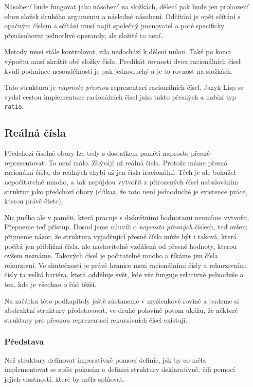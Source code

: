 Násobení bude fungovat jako násobení na složkách, dělení pak bude jen prohození obou složek druhého argumentu a následné násobení. Odčítání je opět sčítání s opačným číslem a sčítání musí najít společný jmenovatel a poté specificky přenásobovat jednotlivé operandy, ale složité to není.

Metody musí stále kontrolovat, zda nedochází k dělení nulou. Také po konci výpočtu musí zkrátit obě složky čísla. Predikát rovnosti dvou racionálních čísel kvůli podmínce nesoudělnosti je pak jednoduchý a je to rovnost na složkách.

Tato struktura je \textit{naprosto přesnou} reprezentací racionálních čísel. Jazyk Lisp se vydal cestou implementace racionálních čísel jako takto přesných a nabízí typ \texttt{ratio}.

\subsection{Reálná čísla}
Předchozí číselné obory lze tedy s dostatkem paměti naprosto přesně reprezentovat. To není málo. Zbývájí už  reálná čísla. Protože máme přesná racionální čísla, do reálných chybí už jen čísla iracionální. Těch je ale bohužel nepočitatelně mnoho, a tak nepůjdou vytvořit z přirozených čísel nabalováním struktur jako předchozí obory (důkaz, že toto není jednoduché je existence práce, kterou právě čtete).

Nic jiného ale v paměti, která pracuje s diskrétními hodnotami neumíme vytvořit. Přepneme teď přístup. Dosud jsme mluvili o \textit{naprosto přesných} číslech, teď ovšem přijmeme názor, že struktura vyjadřující přesné číslo může být i taková, která počítá jen přibližná čísla, ale nastavitelně vzdálená od přesné hodnoty, kterou ovšem neznáme. Takových čísel je počitatelně mnoho a říkáme jim čísla rekurzivní. Ve skutečnosti je právě hranice mezi racionálními čísly a rekurzivními čísly ta velká bariéra, která odděluje svět, kde vše funguje relativně jednoduše a ten, kde je všechno o řád těžší.

Na začátku této podkapitoly ještě zůstaneme v myšlenkové rovině a budeme si abstraktní struktury představovat, ve druhé polovině potom ukážu, že některé struktury pro přesnou reprezentaci rekurzivních čísel existují.

\subsubsection{Představa}\label{kap:predstava}
Než struktury definovat imperativně pomocí definic, jak by co měla implementovat se spíše pokusím o definici struktury deklarativně, čili pomocí jejích vlastností, které by měla splňovat.

